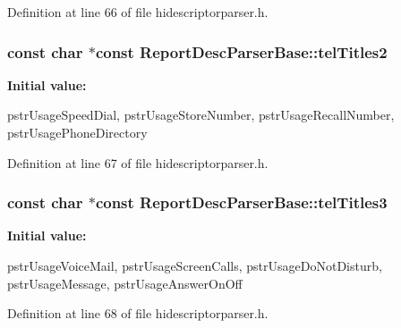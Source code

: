 \-Definition at line 66 of file hidescriptorparser.\-h.

\hypertarget{class_report_desc_parser_base_aefc1ad5b2631c5184c5e58ac44cfbb80}{
\subsubsection[{tel\-Titles2}]{\setlength{\rightskip}{0pt plus 5cm}const char $\ast$const {\bf \-Report\-Desc\-Parser\-Base\-::tel\-Titles2}}}\label{class_report_desc_parser_base_aefc1ad5b2631c5184c5e58ac44cfbb80}
{\bfseries \-Initial value\-:}
\begin{DoxyCode}
 {
        pstrUsageSpeedDial,
        pstrUsageStoreNumber,
        pstrUsageRecallNumber,
        pstrUsagePhoneDirectory
}
\end{DoxyCode}


\-Definition at line 67 of file hidescriptorparser.\-h.

\hypertarget{class_report_desc_parser_base_acc9f0e2b103473be060684e451432661}{
\subsubsection[{tel\-Titles3}]{\setlength{\rightskip}{0pt plus 5cm}const char $\ast$const {\bf \-Report\-Desc\-Parser\-Base\-::tel\-Titles3}}}\label{class_report_desc_parser_base_acc9f0e2b103473be060684e451432661}
{\bfseries \-Initial value\-:}
\begin{DoxyCode}
 {
        pstrUsageVoiceMail,
        pstrUsageScreenCalls,
        pstrUsageDoNotDisturb,
        pstrUsageMessage,
        pstrUsageAnswerOnOff
}
\end{DoxyCode}


\-Definition at line 68 of file hidescriptorparser.\-h.

